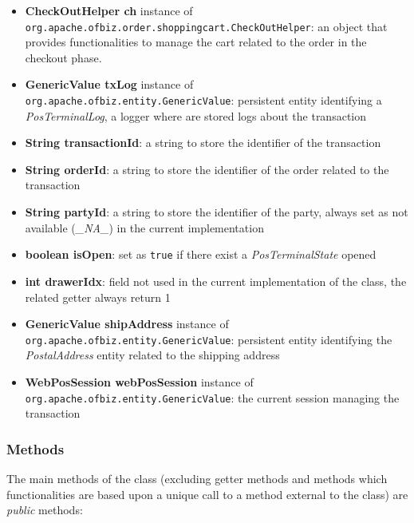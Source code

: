 \begin{itemize}
    \item \textbf{CheckOutHelper ch} instance of \\ \texttt{org.apache.ofbiz.order.shoppingcart.CheckOutHelper}: an object that provides functionalities to manage the cart related to the order in the checkout phase.
    \item \textbf{GenericValue txLog} instance of \\ \texttt{org.apache.ofbiz.entity.GenericValue}: persistent entity identifying a \emph{PosTerminalLog}, a logger where are stored logs about the transaction
    \item \textbf{String transactionId}: a string to store the identifier of the transaction
    \item \textbf{String orderId}: a string to store the identifier of the order related to the transaction
    \item \textbf{String partyId}: a string to store the identifier of the party, always set as not available (\emph{\_NA\_}) in the current  implementation
    \item \textbf{boolean isOpen}: set as \texttt{true} if there exist a \emph{PosTerminalState} opened
    \item \textbf{int drawerIdx}: field not used in the current implementation of the class, the related getter always return 1
    \item \textbf{GenericValue shipAddress} instance of \\ \texttt{org.apache.ofbiz.entity.GenericValue}: persistent entity identifying the \emph{PostalAddress} entity related to the shipping address
    \item \textbf{WebPosSession webPosSession} instance of \\ \texttt{org.apache.ofbiz.entity.GenericValue}: the current session managing the transaction
\end{itemize}
\clearpage
\subsubsection{Methods}

The main methods of the class (excluding getter methods and methods which functionalities are based upon a unique call to a method external to the class) are \emph{public} methods:

